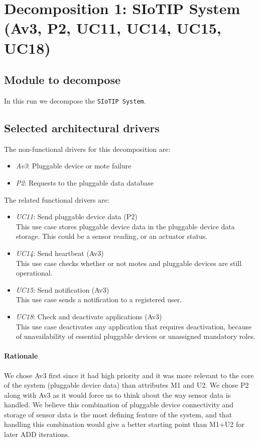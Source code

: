 \section{Decomposition 1: SIoTIP System (Av3, P2, UC11, UC14, UC15, UC18)}
\subsection{Module to decompose}
    In this run we decompose the \texttt{SIoTIP System}.

\subsection{Selected architectural drivers}
    The non-functional drivers for this decomposition are:
    \begin{itemize}
    	\item \emph{Av3}: Pluggable device or mote failure
    	\item \emph{P2}: Requests to the pluggable data database
    \end{itemize}

    \noindent The related functional drivers are:
    \begin{itemize}
        \item \emph{UC11}: Send pluggable device data (P2) \\
              This use case stores pluggable device data in the pluggable device data storage.
              This could be a sensor reading, or an actuator status.
    	\item \emph{UC14}: Send heartbeat (Av3) \\
              This use case checks whether or not motes and pluggable devices
              are still operational.
    	\item \emph{UC15}: Send notification (Av3) \\
              This use case sends a notification to a registered user.
    	\item \emph{UC18}: Check and deactivate applications (Av3) \\
              This use case deactivates any application that requires deactivation,
              because of unavailability of essential pluggable devices
              or unassigned mandatory roles.
    \end{itemize}

    \paragraph{Rationale}
    We chose Av3 first since it had high priority and it was more relevant to
    the core of the system (pluggable device data) than attributes M1 and U2. We
    chose P2 along with Av3 as it would force us to think about the way
    sensor data is handled. We believe this combination of pluggable device connectivity and
    storage of sensor data is the most defining feature of the system, and that
    handling this combination would give a better starting point than M1+U2
    for later ADD iterations.

